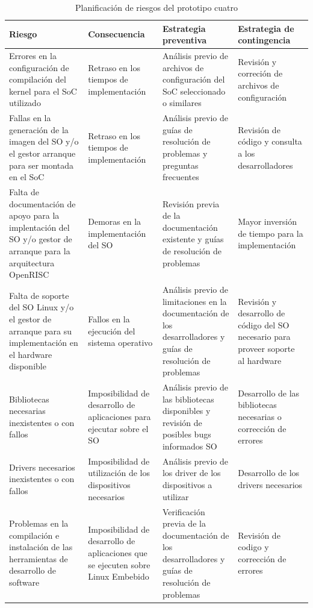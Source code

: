 		\newpage
 		\begin{table}[h!]
		\centering
		\begin{tabular}{ p{4cm} p{4cm} p{4cm} p{3cm} }
		\hline 
		\rowcolor[gray]{0.8} Riesgo & Consecuencia & Estrategia preventiva & Estrategia de contingencia\\
		\hline Errores en la configuración de compilación del kernel para el SoC utilizado & 
		       Retraso en los tiempos de implementación & 
		       Análisis previo de archivos de configuración del SoC seleccionado o similares & 
		       Revisión y correción de archivos de configuración\\
		\hline Fallas en la generación de la imagen del SO y/o el gestor arranque para ser montada en el SoC & 
		       Retraso en los tiempos de implementación & 
		       Análisis previo de guías de resolución de problemas y preguntas frecuentes & 
		       Revisión de código y consulta a los desarrolladores\\
		\hline Falta de documentación de apoyo para la implentación del SO y/o gestor de arranque para la arquitectura OpenRISC & 
		       Demoras en la implementación del SO & 
		       Revisión previa de la documentación existente y guías de resolución de problemas & 
		       Mayor inversión de tiempo para la implementación\\
		\hline Falta de soporte del SO Linux y/o el gestor de arranque para su implementación en el hardware disponible & 
			   Fallos en la ejecución del sistema operativo & 
		       Análisis previo de limitaciones en la documentación de los desarrolladores y guías de resolución de problemas & 
		       Revisión y desarrollo de código del SO necesario para proveer soporte al hardware\\
		\hline Bibliotecas necesarias inexistentes o con fallos & 
			   Imposibilidad de desarrollo de aplicaciones para ejecutar sobre el SO &
			   Análisis previo de las bibliotecas disponibles y revisión de posibles bugs informados SO & 
			   Desarrollo de las bibliotecas necesarias o corrección de errores\\
		\hline Drivers necesarios inexistentes o con fallos & 
			   Imposibilidad de utilización de los dispositivos necesarios & 
			   Análisis previo de los driver de los dispositivos a utilizar & 
			   Desarrollo de los drivers necesarios\\		
		\hline Problemas en la compilación e instalación de las herramientas de desarrollo de software & 
			   Imposibilidad de desarrollo de aplicaciones que se ejecuten sobre Linux Embebido & 
			   Verificación previa de la documentación de los desarrolladores y guías de resolución de problemas & 
			   Revisión de codigo y corrección de errores\\
		\hline
		\end{tabular}
		\caption{Planificación de riesgos del prototipo cuatro}
		\label{tab:planificación4}
		\end{table}


